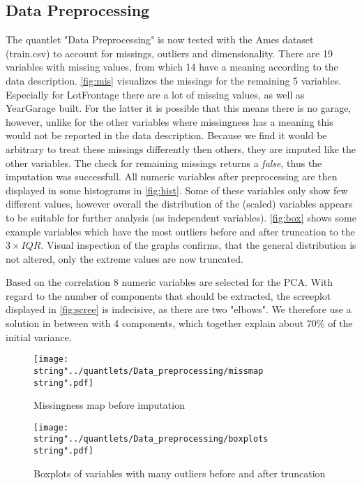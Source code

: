 
\subsection{Data Preprocessing}
The quantlet "Data Preprocessing" is now tested with the Ames dataset (train.csv) to account for missings, outliers and dimensionality. 
There are 19 variables with missing values, from which 14 have a meaning according to the data description. 
\autoref{fig:mis} visualizes the missings for the remaining 5 variables. Especially for LotFrontage there are a lot of missing values, as well as YearGarage built. For the latter it is possible that this means there is no garage, however, unlike for the other variables where missingness has a meaning this would not be reported in the data description. Because we find it would be arbitrary to treat these missings differently then others, they are imputed like the other variables.
The check for remaining missings returns a \textit{false}, thus the imputation was successfull. 
All numeric variables after preprocessing are then displayed in some histograms in \autoref{fig:hist}. Some of these variables only show few different values, however overall the distribution of the (scaled) variables appears to be suitable for further analysis (as independent variables). 
\autoref{fig:box} shows some example variables which have the most outliers before and after truncation to the $3 \times IQR$. Visual inspection of the graphs confirms, that the general distribution is not altered, only the extreme values are now truncated. 


Based on the correlation 8 numeric variables are selected for the PCA. With regard to the number of components that should be extracted, the screeplot displayed in \autoref{fig:scree} is indecisive, as there are two "elbows".  We therefore use a solution in between with 4 components, which together explain about 70\% of the initial variance. 



\begin{figure}[H]
  \centering
\texttt{[image: \\string"../quantlets/Data\_preprocessing/missmap\\string".pdf]}
  \caption{Missingness map before imputation}\label{fig:mis}
\end{figure}
 
\begin{figure}[H]
  \centering
\texttt{[image: \\string"../quantlets/Data\_preprocessing/boxplots\\string".pdf]}
  \caption{Boxplots of variables with many outliers before and after truncation}\label{fig:box}
\end{figure}

